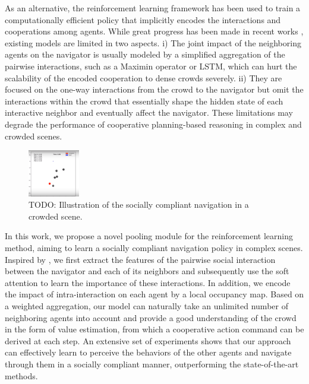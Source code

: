 \documentclass[letterpaper, 10 pt, conference]{ieeeconf}  %
\begin{document}
As an alternative, the reinforcement learning framework has been used to train a computationally efficient policy that implicitly encodes the interactions and cooperations among agents. While great progress has been made in recent works \cite{chen_decentralized_2016,chen_socially_2017,long_towards_2017,everett_motion_2018}, existing models are limited in two aspects. i) The joint impact of the neighboring agents on the navigator is usually modeled by a simplified aggregation of the pairwise interactions, such as a Maximin operator or LSTM, which can hurt the scalability of the encoded cooperation to dense crowds severely. ii) They are focused on the one-way interactions from the crowd to the navigator but omit the interactions within the crowd that essentially shape the hidden state of each interactive neighbor and eventually affect the navigator. These limitations may degrade the performance of cooperative planning-based reasoning in complex and crowded scenes. 

\begin{figure} [t]
  \captionsetup{font=small}
  \includegraphics[width=0.2\textwidth]{figures/overview}
  \caption{TODO: Illustration of the socially compliant navigation in a crowded scene.}
  \label{fig:overview}
\end{figure}

In this work, we propose a novel pooling module for the reinforcement learning method, aiming to learn a socially compliant navigation policy in complex scenes. Inspired by \cite{alahi_social_2016,gupta_social_2018,vemula_social_2017}, we first extract the features of the pairwise social interaction between the navigator and each of its neighbors and subsequently use the soft attention to learn the importance of these interactions. In addition, we encode the impact of intra-interaction on each agent by a local occupancy map. Based on a weighted aggregation, our model can naturally take an unlimited number of neighboring agents into account and provide a good understanding of the crowd in the form of value estimation, from which a cooperative action command can be derived at each step. An extensive set of experiments shows that our approach can effectively learn to perceive the behaviors of the other agents and navigate through them in a socially compliant manner, outperforming the state-of-the-art methods. 
\end{document}
